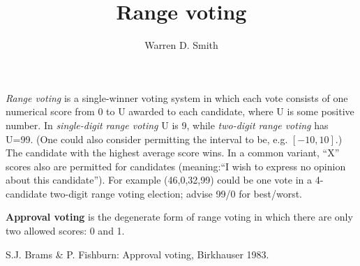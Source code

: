 \documentclass[12pt]{article}
\begin{document}
\title{Range voting}
\author{Warren D. Smith}



\emph{Range voting}
is a single-winner voting system in which each vote consists of one numerical score 
from 0 to U awarded to each candidate,
where U is some positive number. 
In \emph{single-digit range voting} U is 9, 
while \emph{two-digit range voting} has U=99.
(One could also consider permitting the interval to be, e.g. $[-10, 10]$.)
The candidate with the highest average score wins. 
In a common variant, ``X'' scores also are permitted for candidates 
(meaning:``I wish to express no opinion about this candidate''). 
For example  (46,0,32,99)  could be one vote in a 4-candidate two-digit range voting
election; advise 99/0 for best/worst.

{\bf Approval voting} \cite{BramsFAV} is the degenerate form of range voting in which
there are only two allowed scores:  0 and 1.


\begin{thebibliography}{9}



S.J. Brams \& P. Fishburn:  Approval voting, Birkhauser 1983.


\end{thebibliography}
\end{document}
